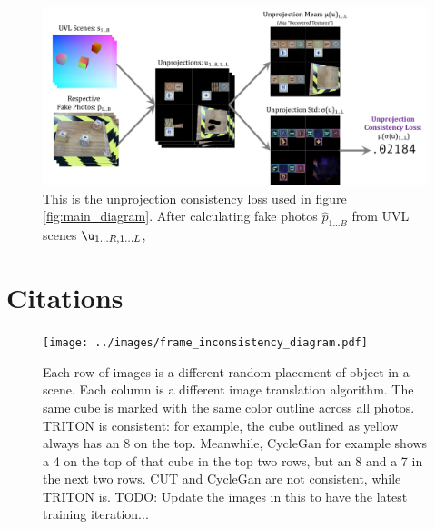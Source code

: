 \documentclass{article}
\begin{document}
\begin{figure}[H]
	\begin{center}
		\includegraphics[width=400pt]{../images/unprojection_consistency_loss.pdf}
	\end{center}
	\caption{
		This is the unprojection consistency loss used in figure \ref{fig:main_diagram}.
		After calculating fake photos $\hat{p}_{1...B}$ from UVL scenes $\u_{1...R,1...L}$, 
	}
	\label{fig:unprojection_consistency_loss}
\end{figure}





\section{Citations}
\label{sec:citations}
\begin{figure}[H]
	\begin{center}
		\texttt{[image: ../images/frame\_inconsistency\_diagram.pdf]}
	\end{center}

	
	\caption{
		Each row of images is a different random placement of object in a scene.
		Each column is a different image translation algorithm.
		The same cube is marked with the same color outline across all photos.
		TRITON is consistent: for example, the cube outlined as yellow always has an 8 on the top.
		Meanwhile, CycleGan for example shows a 4 on the top of that cube in the top two rows, but an 8 and a 7 in the next two rows.
		CUT and CycleGan are not consistent, while TRITON is.
		TODO: Update the images in this to have the latest training iteration...
		}
	\label{fig:frame_inconsistency_diagram}
\end{figure}
\end{document}
